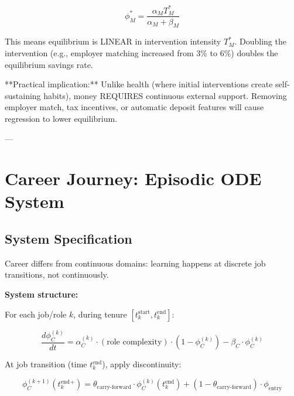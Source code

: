 \begin{equation}
\phi^*_M = \frac{\alpha_M T^*_M}{\alpha_M + \beta_M}
\end{equation}

This means equilibrium is LINEAR in intervention intensity $T^*_M$. Doubling the intervention (e.g., employer matching increased from 3\% to 6\%) doubles the equilibrium savings rate.

**Practical implication:** Unlike health (where initial interventions create self-sustaining habits), money REQUIRES continuous external support. Removing employer match, tax incentives, or automatic deposit features will cause regression to lower equilibrium.

---


\section{Career Journey: Episodic ODE System}
\label{ooo:career}

\subsection{System Specification}

Career differs from continuous domains: learning happens at discrete job transitions, not continuously.

\textbf{System structure:}

For each job/role $k$, during tenure $[t_k^{\text{start}}, t_k^{\text{end}}]$:

\begin{equation}
\frac{d\phi_C^{(k)}}{dt} = \alpha_C^{(k)} \cdot (\text{role complexity}) \cdot (1 - \phi_C^{(k)}) - \beta_C \cdot \phi_C^{(k)}
\label{eq:career-role}
\end{equation}

At job transition (time $t_k^{\text{end}}$), apply discontinuity:

\begin{equation}
\phi_C^{(k+1)}(t_k^{\text{end}}^+) = \theta_{\text{carry-forward}} \cdot \phi_C^{(k)}(t_k^{\text{end}}) + (1 - \theta_{\text{carry-forward}}) \cdot \phi_{\text{entry}}
\label{eq:career-transition}
\end{equation}

